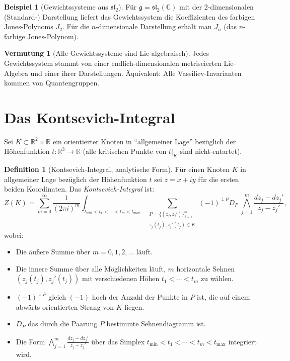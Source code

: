 \documentclass[12pt,a4paper]{amsart}
\theoremstyle{definition}
\newtheorem{example}[theorem]{Beispiel}
\newtheorem{vermutung}[theorem]{Vermutung}
\newtheorem{definition_de}[theorem]{Definition}
\newcommand{\R}{\mathbb{R}}
\newcommand{\C}{\mathbb{C}}
\begin{document}
\begin{example}[Gewichtssysteme aus $\mathfrak{sl}_2$]
Für $\mathfrak{g} = \mathfrak{sl}_2(\C)$ mit der 2-dimensionalen
(Standard-) Darstellung liefert das Gewichtssystem die Koeffizienten
des farbigen Jones-Polynoms $J_2$.  Für die $n$-dimensionale Darstellung
erhält man $J_n$ (das $n$-farbige Jones-Polynom).
\end{example}

\begin{vermutung}[Alle Gewichtssysteme sind Lie-algebraisch]\label{verm:alle_lie}
Jedes Gewichtssystem stammt von einer endlich-dimensionalen metriseierten
Lie-Algebra und einer ihrer Darstellungen.  Äquivalent: Alle Vassiliev-Invarianten
kommen von Quantengruppen.
\end{vermutung}

\section{Das Kontsevich-Integral}\label{sec:KI}

Sei $K \subset \R^2 \times \R$ ein orientierter Knoten in ``allgemeiner Lage''
bezüglich der Höhenfunktion $t: \R^3 \to \R$ (alle kritischen Punkte
von $t|_K$ sind nicht-entartet).

\begin{definition_de}[Kontsevich-Integral, analytische Form]\label{def:KI}
Für einen Knoten $K$ in allgemeiner Lage bezüglich der Höhenfunktion $t$
sei $z = x + iy$ für die ersten beiden Koordinaten.  Das
\emph{Kontsevich-Integral} ist:
\[
  Z(K) = \sum_{m=0}^\infty \frac{1}{(2\pi i)^m}
  \int_{t_{\min} < t_1 < \cdots < t_m < t_{\max}}
  \sum_{\substack{P = \{(z_j, z_j')\}_{j=1}^m \\ z_j(t_j), z_j'(t_j) \in K}}
  (-1)^{\downarrow P} D_P \; \bigwedge_{j=1}^m \frac{d z_j - d z_j'}{z_j - z_j'},
\]
wobei:
\begin{itemize}
  \item Die äußere Summe über $m = 0, 1, 2, \ldots$ läuft.
  \item Die innere Summe über alle Möglichkeiten läuft, $m$ horizontale
        Sehnen $(z_j(t_j), z_j'(t_j))$ mit verschiedenen Höhen
        $t_1 < \cdots < t_m$ zu wählen.
  \item $(-1)^{\downarrow P}$ gleich $(-1)$ hoch der Anzahl der Punkte in $P$
        ist, die auf einem abwärts orientierten Strang von $K$ liegen.
  \item $D_P$ das durch die Paarung $P$ bestimmte Sehnendiagramm ist.
  \item Die Form $\bigwedge_{j=1}^m \frac{dz_j - dz_j'}{z_j - z_j'}$ über
        das Simplex $t_{\min} < t_1 < \cdots < t_m < t_{\max}$ integriert wird.
\end{itemize}
\end{definition_de}
\end{document}
